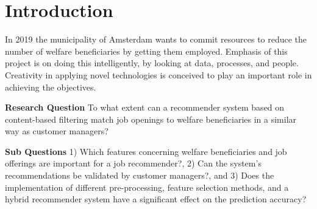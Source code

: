\section{Introduction}
In 2019 the municipality of Amsterdam wants to commit resources to reduce the number of welfare beneficiaries by getting them employed. 
Emphasis of this project is on doing  this intelligently, by looking at data, processes, and people.
Creativity in applying novel technologies is conceived to play an important role in achieving the objectives.

\textbf{Research Question} To what extent can a recommender system based on content-based filtering match job openings to welfare beneficiaries in a similar way as customer managers?

\textbf{Sub Questions}
1) Which features concerning welfare beneficiaries and job offerings are important for a job recommender?, 2) Can the system’s recommendations be validated by customer managers?, and 3) Does the implementation of different pre-processing, feature selection methods, and a hybrid recommender system have a significant effect on the prediction accuracy?









